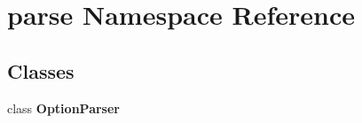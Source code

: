 \section{parse Namespace Reference}
\label{namespaceparse}


\subsection*{Classes}
\begin{CompactItemize}
\item 
class {\bf OptionParser}
\end{CompactItemize}
